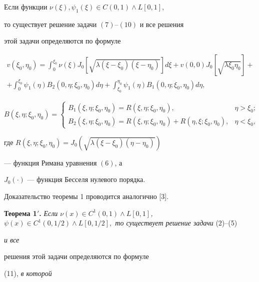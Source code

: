 \begin{thm}


Если функции $\nu(\xi),\psi_1(\xi)\in C(0,1)\land L[0,1],$


то существует решение задачи $(7)$--$(10)$ и все решения


этой задачи определяются по формуле


\begin{multline}


v(\xi_0,\eta_0)=\int_0^{\xi_0}\nu(\xi)J_0[\sqrt{\lambda(\xi-\xi_0)


(\xi-\eta_0)}]d\xi+v(0,0)J_0[\sqrt{\lambda\xi_0\eta_0}]+ \\


%


+\int_0^{\xi_0}


\psi_1(\eta)B_2(0,\eta;\xi_0,\eta_0)d\eta+\int_{\xi_0}^{\eta_0}\psi_1


(\eta)B_1(0,\eta;\xi_0,\eta_0)d\eta,


\end{multline}


$$


B(\xi,\eta;\xi_0,\eta_0)=


\begin{cases}


B_1(\xi,\eta;\xi_0,\eta_0)=R(\xi,\eta;\xi_0,\eta_0), & \eta>\xi_0;\\


B_2(\xi,\eta;\xi_0,\eta_0)=R(\xi,\eta;\xi_0,\eta_0)+R


(\eta,\xi;\xi_0,\eta_0), & \eta<\xi_0,


\end{cases}


$$


где $R(\xi,\eta;\xi_0,\eta_0)=J_0(\sqrt{\lambda(\xi-\xi_0)(\eta-\eta_0)})$


--- функция Римана уравнения $(6)$, а


$J_0(\cdot)$ --- функция Бесселя нулевого порядка.


\end{thm}





Доказательство теоремы 1 проводится аналогично [3].


\medskip





{\bf Теорема 1$'$.} {\it Если $\nu(x)\in C^1(0,1)\land L[0,1]$, $\psi(x)\in


C^1(0,1/2)\land L[0,1/2],$ то существует решение задачи} (2)--(5) {\it и все


решения этой задачи определяются по формуле} (11), {\it в которой}


